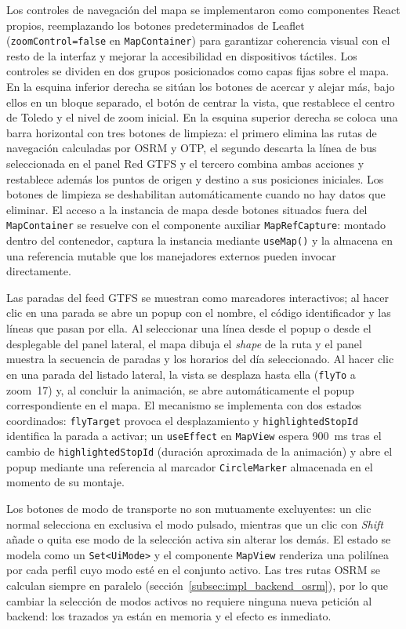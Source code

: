 Los controles de navegación del mapa se implementaron como componentes React propios, reemplazando los botones predeterminados de Leaflet (\texttt{zoomControl={false}} en \texttt{MapContainer}) para garantizar coherencia visual con el resto de la interfaz y mejorar la accesibilidad en dispositivos táctiles. Los controles se dividen en dos grupos posicionados como capas fijas sobre el mapa. En la esquina inferior derecha se sitúan los botones de acercar y alejar más, bajo ellos en un bloque separado, el botón de centrar la vista, que restablece el centro de Toledo y el nivel de zoom inicial. En la esquina superior derecha se coloca una barra horizontal con tres botones de limpieza: el primero elimina las rutas de navegación calculadas por OSRM y OTP, el segundo descarta la línea de bus seleccionada en el panel Red GTFS y el tercero combina ambas acciones y restablece además los puntos de origen y destino a sus posiciones iniciales. Los botones de limpieza se deshabilitan automáticamente cuando no hay datos que eliminar. El acceso a la instancia de mapa desde botones situados fuera del \texttt{MapContainer} se resuelve con el componente auxiliar \texttt{MapRefCapture}: montado dentro del contenedor, captura la instancia mediante \texttt{useMap()} y la almacena en una referencia mutable que los manejadores externos pueden invocar directamente.

Las paradas del feed GTFS se muestran como marcadores interactivos; al hacer clic en una parada se abre un popup con el nombre, el código identificador y las líneas que pasan por ella. Al seleccionar una línea desde el popup o desde el desplegable del panel lateral, el mapa dibuja el \textit{shape} de la ruta y el panel muestra la secuencia de paradas y los horarios del día seleccionado. Al hacer clic en una parada del listado lateral, la vista se desplaza hasta ella (\texttt{flyTo} a zoom~17) y, al concluir la animación, se abre automáticamente el popup correspondiente en el mapa. El mecanismo se implementa con dos estados coordinados: \texttt{flyTarget} provoca el desplazamiento y \texttt{highlightedStopId} identifica la parada a activar; un \texttt{useEffect} en \texttt{MapView} espera 900~ms tras el cambio de \texttt{highlightedStopId} (duración aproximada de la animación) y abre el popup mediante una referencia al marcador \texttt{CircleMarker} almacenada en el momento de su montaje.

Los botones de modo de transporte no son mutuamente excluyentes: un clic normal selecciona en exclusiva el modo pulsado, mientras que un clic con \textit{Shift} añade o quita ese modo de la selección activa sin alterar los demás. El estado se modela como un \texttt{Set<UiMode>} y el componente \texttt{MapView} renderiza una polilínea por cada perfil cuyo modo esté en el conjunto activo. Las tres rutas OSRM se calculan siempre en paralelo (sección~\ref{subsec:impl_backend_osrm}), por lo que cambiar la selección de modos activos no requiere ninguna nueva petición al backend: los trazados ya están en memoria y el efecto es inmediato.


